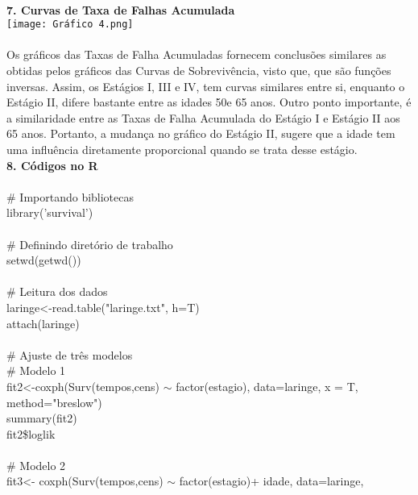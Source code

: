 \documentclass[12pt,a4paper]{article}
\begin{document}
 	\vspace{2cm}\\
 	\textbf{7. Curvas de Taxa de Falhas Acumulada}
 	\vspace{1cm}\\
 	\texttt{[image: Gráfico 4.png]}\\
 	\vspace{1cm}\\
 	Os gráficos das Taxas de Falha Acumuladas fornecem conclusões similares as obtidas pelos gráficos das Curvas de Sobrevivência, visto que, que são funções inversas. Assim, os Estágios I, III e IV, tem curvas similares entre si, enquanto o Estágio II, difere bastante entre as idades 50e 65 anos. Outro ponto importante, é a similaridade entre as Taxas de Falha Acumulada do Estágio I e Estágio II aos 65 anos. Portanto, a mudança no gráfico do Estágio II, sugere que a idade tem uma influência diretamente proporcional quando se trata desse estágio.    
 	\vspace{2cm}\\
 	\textbf{8. Códigos no R}\\
 	\vspace{1cm}\\
 	\# Importando bibliotecas\\
 	library('survival')\\
 	\vspace{0.25cm}\\
 	\# Definindo diretório de trabalho\\
 	setwd(getwd())\\
 	\vspace{0.25cm}\\
 	\# Leitura dos dados\\
 	laringe<-read.table("laringe.txt", h=T)\\
 	attach(laringe)\\
 	\vspace{0.25cm}\\
 	\# Ajuste de três modelos\\
 	\# Modelo 1\\
 	fit2<-coxph(Surv(tempos,cens) $\sim$ factor(estagio), data=laringe,
 	x = T, method="breslow")\\
 	summary(fit2)\\
 	fit2\$loglik\\
 	\vspace{0.25cm}\\
 	\# Modelo 2\\
 	fit3<- coxph(Surv(tempos,cens) $\sim$ factor(estagio)+ idade, data=laringe,
\end{document}
